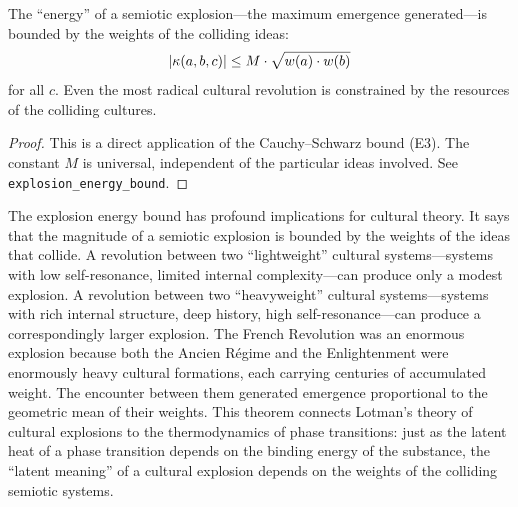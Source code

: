\begin{theorem}
\label{thm:explosion-energy}
The ``energy'' of a semiotic explosion---the maximum emergence generated---is bounded by the weights of the colliding ideas:
\[
  |\kappa(a, b, c)| \leq M \cdot \sqrt{w(a) \cdot w(b)}
\]
for all $c$. Even the most radical cultural revolution is constrained by the resources of the colliding cultures.
\end{theorem}

\begin{proof}
This is a direct application of the Cauchy--Schwarz bound (E3). The constant $M$ is universal, independent of the particular ideas involved. See \texttt{explosion\_energy\_bound}.
\end{proof}

\begin{interpretation}
The explosion energy bound has profound implications for cultural theory. It says that the magnitude of a semiotic explosion is bounded by the weights of the ideas that collide. A revolution between two ``lightweight'' cultural systems---systems with low self-resonance, limited internal complexity---can produce only a modest explosion. A revolution between two ``heavyweight'' cultural systems---systems with rich internal structure, deep history, high self-resonance---can produce a correspondingly larger explosion. The French Revolution was an enormous explosion because both the Ancien R\'egime and the Enlightenment were enormously heavy cultural formations, each carrying centuries of accumulated weight. The encounter between them generated emergence proportional to the geometric mean of their weights. This theorem connects Lotman's theory of cultural explosions to the thermodynamics of phase transitions: just as the latent heat of a phase transition depends on the binding energy of the substance, the ``latent meaning'' of a cultural explosion depends on the weights of the colliding semiotic systems.
\end{interpretation}

